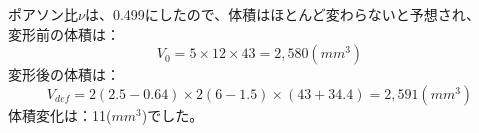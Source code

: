 ポアソン比$\nu$は、0.499にしたので、体積はほとんど変わらないと予想され、\\
変形前の体積は：
\begin{equation}
	V_{0}=5\times12\times43=2,580(mm^{3})
\end{equation}
変形後の体積は：
\begin{equation}
	V_{def}=2(2.5-0.64)\times2(6-1.5)\times(43+34.4)=2,591(mm^{3})
\end{equation}
体積変化は：11($mm^{3}$)でした。